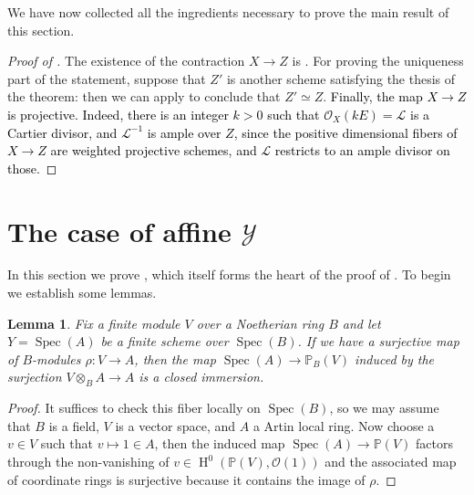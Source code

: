\documentclass{amsart}
\newcommand{\oH}{\operatorname{H}}
\newcommand{\cL}{\mathcal{L}}
\newcommand{\cO}{\mathcal{O}}
\newcommand{\cY}{\mathcal{Y}}
\newcommand{\spec}{\operatorname{Spec}}
\newtheorem{Lemma}[theorem]{Lemma}
\theoremstyle{definition}
\begin{document}
We have now collected all the ingredients necessary to prove the main result of this section.
\begin{proof}[Proof of ]
    The existence of the contraction $X\to Z$ is . For proving the uniqueness part of the statement, suppose that $Z'$ is another scheme satisfying the thesis of the theorem: then we can apply  to conclude that $Z'\simeq Z$. \textcolor{black}{Finally, the map $X\to Z$ is projective. Indeed, there is an integer $k>0$ such that $\cO_X(kE)=\cL$ is a Cartier divisor, and $\cL^{-1}$ is ample over $Z$, since the positive dimensional fibers of $X\to Z$ are weighted projective schemes, and $\cL$ restricts to an ample divisor on those.}
\end{proof}

 \section{The case of affine $\cY$}\label{section_local_analisis}
 In this section we prove , which itself forms the heart of the proof of . To begin we establish some lemmas. 

 \begin{Lemma} \label{lem:surjobvi} Fix a finite module $V$ over a Noetherian ring $B$ and let $Y=\spec(A)$ be a finite scheme over $\spec(B)$. If we have a surjective map of $B$-modules $\rho\colon V \to A$, then the map $\spec(A) \to \mathbb{P}_B(V)$ induced by the surjection $V \otimes_B A \to A$ is a closed immersion. 
 \end{Lemma}

 \begin{proof} It suffices to check this fiber locally on $\spec(B)$, so we may assume that $B$ is a field, $V$ is a vector space, and $A$ a Artin local ring. Now choose a $v \in V$ such that $v \mapsto 1 \in A$, then the induced map $\spec(A) \to \mathbb{P}(V)$ factors through the non-vanishing of $v \in \oH^0(\mathbb{P}(V),\mathcal{O}(1))$ and the associated map of coordinate rings is surjective because it contains the image of $\rho$.\end{proof} 
\end{document}
